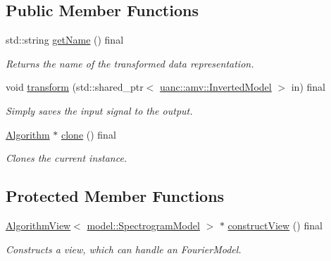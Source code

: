 \subsection*{Public Member Functions}
\begin{DoxyCompactItemize}
\item 
std\+::string \hyperlink{classuanc_1_1amv_1_1signal_1_1algorithm_1_1_spectrogram_transformation_algorithm_ab3f352205061c1b6aaa87c6e7c3dbece}{get\+Name} () final
\begin{DoxyCompactList}\small\item\em Returns the name of the transformed data representation. \end{DoxyCompactList}\item 
void \hyperlink{classuanc_1_1amv_1_1signal_1_1algorithm_1_1_spectrogram_transformation_algorithm_a988bc9d4cc15eafb384ed5c81885ef43}{transform} (std\+::shared\+\_\+ptr$<$ \hyperlink{classuanc_1_1amv_1_1_inverted_model}{uanc\+::amv\+::\+Inverted\+Model} $>$ in) final
\begin{DoxyCompactList}\small\item\em Simply saves the input signal to the output. \end{DoxyCompactList}\item 
\hyperlink{classuanc_1_1amv_1_1_algorithm}{Algorithm} $\ast$ \hyperlink{classuanc_1_1amv_1_1signal_1_1algorithm_1_1_spectrogram_transformation_algorithm_a6efc3617627883a6d2acc52e582dd5a3}{clone} () final
\begin{DoxyCompactList}\small\item\em Clones the current instance. \end{DoxyCompactList}\end{DoxyCompactItemize}
\subsection*{Protected Member Functions}
\begin{DoxyCompactItemize}
\item 
\hyperlink{classuanc_1_1amv_1_1_algorithm_view}{Algorithm\+View}$<$ \hyperlink{classuanc_1_1amv_1_1signal_1_1model_1_1_spectrogram_model}{model\+::\+Spectrogram\+Model} $>$ $\ast$ \hyperlink{classuanc_1_1amv_1_1signal_1_1algorithm_1_1_spectrogram_transformation_algorithm_aa36e723764a73225f490cf6baf693a21}{construct\+View} () final
\begin{DoxyCompactList}\small\item\em Constructs a view, which can handle an Fourier\+Model. \end{DoxyCompactList}\end{DoxyCompactItemize}


